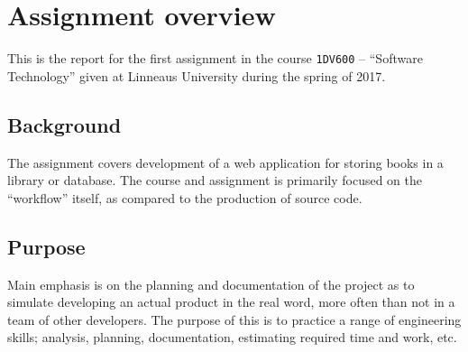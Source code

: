 %
%
%
%


\section{Assignment overview}
This is the report for the first assignment in the course \texttt{1DV600} --
``Software Technology'' given at Linneaus University during the spring of 2017.


\subsection{Background}
The assignment covers development of a web application for storing books in a
library or database. The course and assignment is primarily focused on the
``workflow'' itself, as compared to the production of source code.  


\subsection{Purpose}
Main emphasis is on the planning and documentation of the project as to
simulate developing an actual product in the real word, more often than not in
a team of other developers.
The purpose of this is to practice a range of engineering skills; analysis,
planning, documentation, estimating required time and work, etc.

